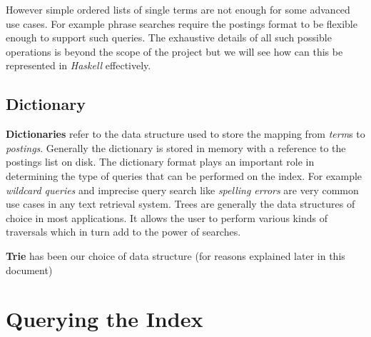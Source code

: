 However simple ordered lists of single terms are not enough for some advanced use cases.
For example phrase searches require the postings format to be flexible enough to support such queries.
The exhaustive details of all such possible operations is beyond the scope of the project but we will see how can this be represented
in \textit{Haskell} effectively.


\subsection{Dictionary}
\textbf{Dictionaries} refer to the data structure used to store the mapping from \textit{term}s to \textit{postings}.
Generally the dictionary is stored in memory with a reference to the postings list on disk.
The dictionary format plays an important role in determining the type of queries that can be performed on the index.
For example \textit{wildcard queries} and imprecise query search like \textit{spelling errors} are very common use cases in any text retrieval system.
Trees are generally the data structures of choice in most applications.
It allows the user to perform various kinds of traversals which in turn add to the power of searches.

\textbf{Trie} has been our choice of data structure (for reasons explained later in this document)


\section{Querying the Index}


